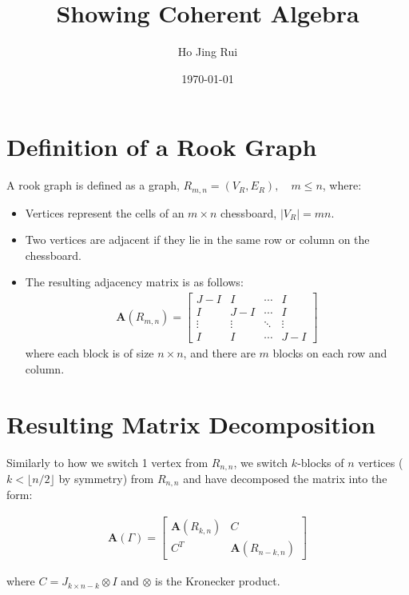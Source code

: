 \documentclass{article}
\title{Showing Coherent Algebra}
\author{Ho Jing Rui}
\date{\today}
\begin{document}
\maketitle
\newpage

\section*{Definition of a Rook Graph}

A rook graph is defined as a graph, \(R_{m,n} = (V_R,E_R), \quad m\leq n\), where:
\begin{itemize}
    \item Vertices represent the cells of an \( m \times n \) chessboard, \(|V_R| = mn\).
    \item Two vertices are adjacent if they lie in the same row or column on the chessboard.
    \item The resulting adjacency matrix is as follows:
    \begin{align*}
        \mathbf{A}(R_{m,n}) = \begin{bmatrix}
            J-I & I & \cdots & I \\
            I & J-I & \cdots & I \\
            \vdots & \vdots & \ddots & \vdots \\
            I & I & \cdots & J-I
        \end{bmatrix}
    \end{align*}
    where each block is of size $n\times n$, and there are $m$ blocks on each row and column.
\end{itemize}

\section*{Resulting Matrix Decomposition}

Similarly to how we switch 1 vertex from $R_{n,n}$, we switch $k$-blocks of $n$ vertices ($k<\lfloor n/2\rfloor$ by symmetry) from $R_{n,n}$ and have decomposed the matrix into the form:

\begin{align*}
    \mathbf{A}(\Gamma) = \begin{bmatrix}
        \mathbf{A}(R_{k,n}) & C \\
        C^T & \mathbf{A}(R_{n-k, n})
    \end{bmatrix}
\end{align*}

where $C = J_{k\times n-k} \otimes I$ and $\otimes$ is the Kronecker product.
\end{document}
